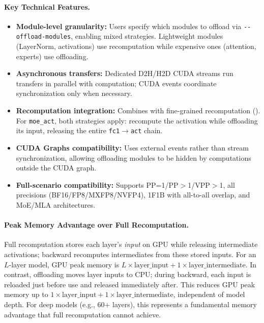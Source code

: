 \documentclass[10pt,logo,copyright]{nvidiatechreport}
\begin{document}
\paragraph{Key Technical Features.}
\begin{itemize}[itemsep=2pt,topsep=4pt]
    \item \textbf{Module-level granularity:} Users specify which modules to offload via \verb|--offload-modules|, enabling mixed strategies. Lightweight modules (LayerNorm, activations) use recomputation while expensive ones (attention, experts) use offloading.
    \item \textbf{Asynchronous transfers:} Dedicated D2H/H2D CUDA streams run transfers in parallel with computation; CUDA events coordinate synchronization only when necessary.
    \item \textbf{Recomputation integration:} Combines with fine-grained recomputation (). For \texttt{moe\_act}, both strategies apply: recompute the activation while offloading its input, releasing the entire \texttt{fc1}$\rightarrow$\texttt{act} chain.
    \item \textbf{CUDA Graphs compatibility:} Uses external events rather than stream synchronization, allowing offloading modules to be hidden by computations outside the CUDA graph.
    \item \textbf{Full-scenario compatibility:} Supports PP=1/PP$>$1/VPP$>$1, all precisions (BF16/FP8/MXFP8/NVFP4), 1F1B with all-to-all overlap, and MoE/MLA architectures.
\end{itemize}

\paragraph{Peak Memory Advantage over Full Recomputation.}
Full recomputation stores each layer's \textit{input} on GPU while releasing intermediate activations; backward recomputes intermediates from these stored inputs. For an $L$-layer model, GPU peak memory is $L \times \text{layer\_input} + 1 \times \text{layer\_intermediate}$. In contrast, offloading moves layer inputs to CPU; during backward, each input is reloaded just before use and released immediately after. This reduces GPU peak memory up to $1 \times \text{layer\_input} + 1 \times \text{layer\_intermediate}$, independent of model depth. For deep models (e.g., 60+ layers), this represents a fundamental memory advantage that full recomputation cannot achieve.
\end{document}
